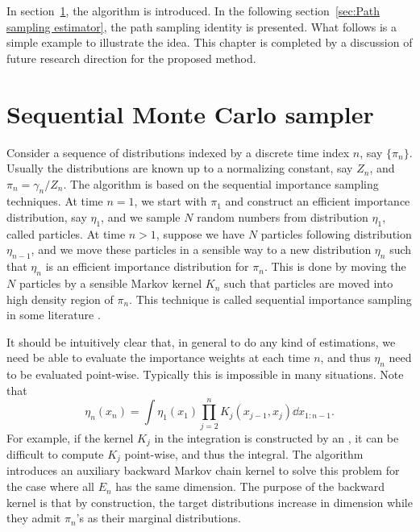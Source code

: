 In section~\ref{sec:smc algorithm}, the \smc algorithm is introduced. In the
following section~\ref{sec:Path sampling estimator}, the path sampling
identity is presented. What follows is a simple example to illustrate the
idea. This chapter is completed by a discussion of future research direction
for the proposed method.

\section{Sequential Monte Carlo sampler}
\label{sec:smc algorithm}

Consider a sequence of distributions indexed by a discrete time index $n$, say
$\{\pi_n\}$. Usually the distributions are known up to a normalizing constant,
say $Z_n$, and $\pi_n = \gamma_n/Z_n$. The \smc algorithm is based on the
sequential importance sampling techniques. At time $n = 1$, we start with
$\pi_1$ and construct an efficient importance distribution, say $\eta_1$, and
we sample $N$ random numbers from distribution $\eta_1$, called particles. At
time $n > 1$, suppose we have $N$ particles following distribution
$\eta_{n-1}$, and we move these particles in a sensible way to a new
distribution $\eta_n$ such that $\eta_n$ is an efficient importance
distribution for $\pi_n$. This is done by moving the $N$ particles by a
sensible Markov kernel $K_n$ such that particles are moved into high density
region of $\pi_n$. This technique is called sequential importance sampling in
some literature \parencite[e.g.][]{DelMoral2006}.

It should be intuitively clear that, in general to do any kind of estimations,
we need be able to evaluate the importance weights at each time $n$, and thus
$\eta_n$ need to be evaluated point-wise. Typically this is impossible in many
situations. Note that
\begin{equation}
  \eta_n(x_n) = \int\eta_1(x_1)\prod_{j=2}^nK_j(x_{j-1},x_j) \dd x_{1:n-1}.
  \label{eq:marginal importance}
\end{equation}
For example, if the kernel $K_j$ in the integration is constructed by an \mha,
it can be difficult to compute $K_j$ point-wise, and thus the integral. The
\smc algorithm introduces an auxiliary backward Markov chain kernel to solve
this problem for the case where all $E_n$ has the same dimension. The purpose
of the backward kernel is that by construction, the target distributions
increase in dimension while they admit $\pi_n$'s as their marginal
distributions.

